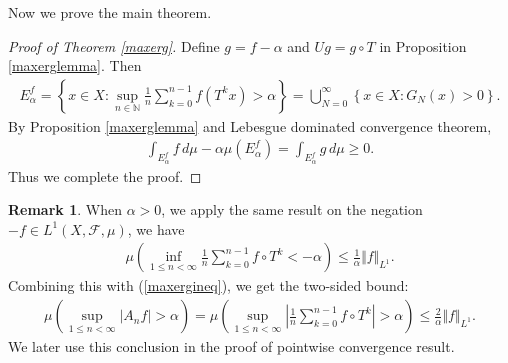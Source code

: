 \documentclass{article}
\numberwithin{equation}{section}
\newcommand{\bbN}{\mathbb{N}}
\newcommand{\scr}{\mathscr}
\theoremstyle{plain}
\theoremstyle{definition}
\newtheorem*{remark}{Remark}
\begin{document}
Now we prove the main theorem.
\begin{proof}[Proof of Theorem \ref{maxerg}]
Define $g=f-\alpha$ and $Ug=g\circ T$ in Proposition \ref{maxerglemma}. Then
\begin{align*}
	E_\alpha^f=\left\{x\in X:\sup_{n\in\bbN}\frac{1}{n}\sum_{k=0}^{n-1}f(T^k x)>\alpha\right\}=\bigcup_{N=0}^\infty\left\{x\in X:G_N(x)>0\right\}.
\end{align*}
By Proposition \ref{maxerglemma} and Lebesgue dominated convergence theorem,
\begin{align*}
	\int_{E_\alpha^f} f\,d\mu-\alpha\mu(E_\alpha^f)=\int_{E_\alpha^f} g\,d\mu\geq 0.
\end{align*}
Thus we complete the proof.
\end{proof}
\begin{remark}
When $\alpha>0$, we apply the same result on the negation $-f\in L^1(X,\scr{F},\mu)$, we have
\begin{align*}
	\mu\left(\inf_{1\leq n<\infty}\frac{1}{n}\sum_{k=0}^{n-1}f\circ T^k<-\alpha\right)\leq\frac{1}{\alpha}\Vert f\Vert_{L^1}.
\end{align*}
Combining this with (\ref{maxergineq}), we get the two-sided bound:
\begin{align*}
	\mu\left(\sup_{1\leq n<\infty}\vert A_nf \vert>\alpha\right)=\mu\left(\sup_{1\leq n<\infty}\left\vert\frac{1}{n}\sum_{k=0}^{n-1}f\circ T^k\right\vert>\alpha\right)\leq\frac{2}{\alpha}\Vert f\Vert_{L^1}.
\end{align*}
We later use this conclusion in the proof of pointwise convergence result.
\end{remark}
\end{document}
